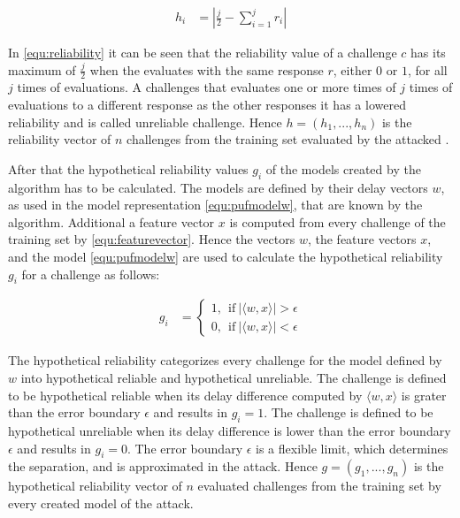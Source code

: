\begin{align}
h_i &= |\frac{j}{2} - \sum_{i = 1}^{j}r_i| \label{equ:reliability}
\end{align}

In \ref{equ:reliability} it can be seen that the reliability value of a challenge $c$ has its maximum of $\frac{j}{2}$ when the \puf evaluates with the same response $r$, either $0$ or $1$, for all $j$ times of evaluations.
A challenges that evaluates one or more times of $j$ times of evaluations to a different response as the other responses it has a lowered reliability and is called unreliable challenge.
Hence $h = (h_1, ..., h_n)$ is the reliability vector of $n$ challenges from the training set evaluated by the attacked \puf.

After that the hypothetical reliability values $g_i$ of the models created by the algorithm has to be calculated.
The models are defined by their delay vectors $w$, as used in the \apuf model representation \ref{equ:pufmodelw}, that are known by the algorithm.
Additional a feature vector $x$ is computed from every challenge of the training set by \ref{equ:featurevector}.
Hence the vectors $w$, the feature vectors $x$, and the \apuf model \ref{equ:pufmodelw} are used to calculate the hypothetical reliability $g_i$ for a challenge as follows:

\begin{equation}
\begin{aligned}
g_i &=
\begin{cases}
1,\ \ \text{if}\ |\langle w, x \rangle| > \epsilon\\
0,\ \ \text{if}\ |\langle w, x \rangle| < \epsilon \label{equ:hypotheticalreliability}
\end{cases}
\end{aligned}
\end{equation}

The hypothetical reliability categorizes every challenge for the model defined by $w$ into hypothetical reliable and hypothetical unreliable.
The challenge is defined to be hypothetical reliable when its delay difference computed by $\langle w, x \rangle$ is grater than the error boundary $\epsilon$ and results in $g_i = 1$.
The challenge is defined to be hypothetical unreliable when its delay difference is lower than the error boundary $\epsilon$ and results in $g_i = 0$.
The error boundary $\epsilon$ is a flexible limit, which determines the separation, and is approximated in the attack.
Hence $g = (g_1, ..., g_n)$ is the hypothetical reliability vector of $n$ evaluated challenges from the training set by every created model of the attack.

